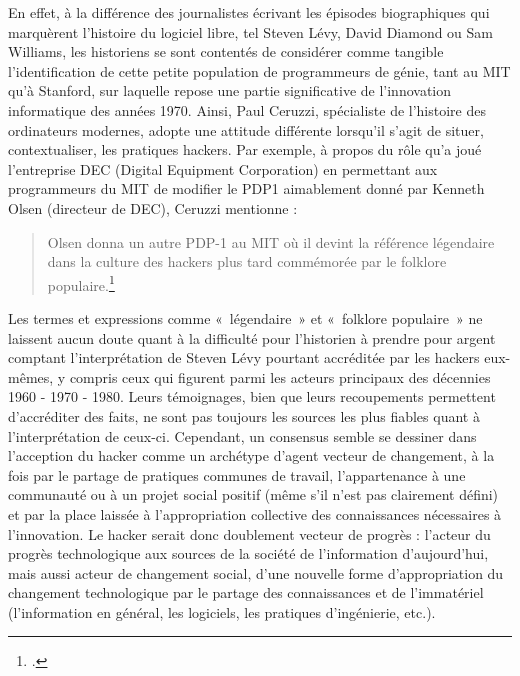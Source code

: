 \documentclass{FramateX}
\begin{document}
\begin{refsection}
En effet, à la différence des journalistes écrivant les épisodes
biographiques qui marquèrent l'histoire du logiciel
libre, tel Steven Lévy, David Diamond ou Sam Williams, les historiens
se sont contentés de considérer comme tangible
l'identification de cette petite population de
programmeurs de génie, tant au MIT qu'à Stanford, sur
laquelle repose une partie significative de
l'innovation informatique des années 1970. Ainsi, Paul
Ceruzzi, spécialiste de l'histoire des ordinateurs
modernes, adopte une attitude différente lorsqu'il
s'agit de situer, contextualiser, les pratiques
hackers. Par exemple, à propos du rôle qu'a joué
l'entreprise DEC (Digital Equipment Corporation) en
permettant aux programmeurs du MIT de modifier le PDP1 aimablement
donné par Kenneth Olsen (directeur de DEC), Ceruzzi mentionne : 
\begin{quote}
Olsen donna un autre PDP-1 au MIT où il devint la référence légendaire
dans la culture des hackers plus tard commémorée par le folklore
populaire.\footnote{\cite[p.~128]{ceruzzihistory1998}.}
\end{quote}

Les termes et expressions comme «~légendaire~» et «~folklore populaire~»
ne laissent aucun doute quant à la difficulté pour
l'historien à prendre pour argent comptant
l'interprétation de Steven Lévy pourtant accréditée
par les hackers eux-mêmes, y compris ceux qui figurent parmi les
acteurs principaux des décennies 1960 - 1970 - 1980. Leurs témoignages,
bien que leurs recoupements permettent d'accréditer
des faits, ne sont pas toujours les sources les plus fiables quant à
l'interprétation de ceux-ci. Cependant, un consensus
semble se dessiner dans l'acception du hacker comme un
archétype d'agent vecteur de changement, à la fois
par le partage de pratiques communes de travail,
l'appartenance à une communauté ou à un projet social
positif (même s'il n'est pas
clairement défini) et par la place laissée à
l'appropriation collective des connaissances
nécessaires à l'innovation. Le hacker serait donc
doublement vecteur de progrès : l'acteur du progrès
technologique aux sources de la société de
l'information
d'aujourd'hui, mais aussi acteur de
changement social, d'une nouvelle forme
d'appropriation du changement technologique par le
partage des connaissances et de l'immatériel
(l'information en général, les logiciels, les
pratiques d'ingénierie, etc.).


\end{refsection}
\end{document}
